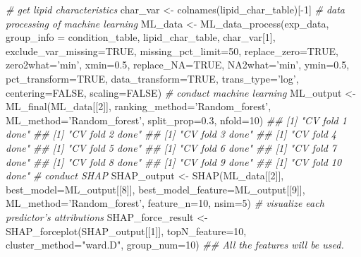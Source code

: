 \documentclass[]{article}
\newcommand{\hlnum}[1]{\textcolor[rgb]{0.816,0.125,0.439}{#1}}%
\newcommand{\hlstr}[1]{\textcolor[rgb]{0.251,0.627,0.251}{#1}}%
\newcommand{\hlcom}[1]{\textcolor[rgb]{0.502,0.502,0.502}{\textit{#1}}}%
\newcommand{\hlopt}[1]{\textcolor[rgb]{0,0,0}{#1}}%
\newcommand{\hlstd}[1]{\textcolor[rgb]{0.251,0.251,0.251}{#1}}%
\newcommand{\hlkwc}[1]{\textcolor[rgb]{0.251,0.251,0.251}{#1}}%
\newcommand{\hlkwd}[1]{\textcolor[rgb]{0.878,0.439,0.125}{#1}}%
\newenvironment{Shaded}{\begin{myshaded}}{\end{myshaded}}
\newcommand{\KeywordTok}[1]{\hlkwd{#1}}
\newcommand{\DataTypeTok}[1]{\hlkwc{#1}}
\newcommand{\DecValTok}[1]{\hlnum{#1}}
\newcommand{\FloatTok}[1]{\hlnum{#1}}
\newcommand{\StringTok}[1]{\hlstr{#1}}
\newcommand{\CommentTok}[1]{\hlcom{#1}}
\newcommand{\OtherTok}[1]{{#1}}
\newcommand{\OperatorTok}[1]{\hlopt{#1}}
\newcommand{\NormalTok}[1]{\hlstd{#1}}
\begin{document}
\begin{Shaded}
\begin{Highlighting}[]
\CommentTok{# get lipid characteristics}
\NormalTok{char_var <-}\StringTok{ }\KeywordTok{colnames}\NormalTok{(lipid_char_table)[}\OperatorTok{-}\DecValTok{1}\NormalTok{]}
\CommentTok{# data processing of machine learning}
\NormalTok{ML_data <-}\StringTok{ }\KeywordTok{ML_data_process}\NormalTok{(exp_data, }\DataTypeTok{group_info =}\NormalTok{ condition_table,}
\NormalTok{                           lipid_char_table, char_var[}\DecValTok{1}\NormalTok{],}
                           \DataTypeTok{exclude_var_missing=}\OtherTok{TRUE}\NormalTok{, }\DataTypeTok{missing_pct_limit=}\DecValTok{50}\NormalTok{,}
                           \DataTypeTok{replace_zero=}\OtherTok{TRUE}\NormalTok{, }\DataTypeTok{zero2what=}\StringTok{'min'}\NormalTok{, }\DataTypeTok{xmin=}\FloatTok{0.5}\NormalTok{,}
                           \DataTypeTok{replace_NA=}\OtherTok{TRUE}\NormalTok{, }\DataTypeTok{NA2what=}\StringTok{'min'}\NormalTok{, }\DataTypeTok{ymin=}\FloatTok{0.5}\NormalTok{,}
                           \DataTypeTok{pct_transform=}\OtherTok{TRUE}\NormalTok{, }\DataTypeTok{data_transform=}\OtherTok{TRUE}\NormalTok{,}
                           \DataTypeTok{trans_type=}\StringTok{'log'}\NormalTok{, }\DataTypeTok{centering=}\OtherTok{FALSE}\NormalTok{, }\DataTypeTok{scaling=}\OtherTok{FALSE}\NormalTok{)}
\CommentTok{# conduct machine learning}
\NormalTok{ML_output <-}\StringTok{ }\KeywordTok{ML_final}\NormalTok{(ML_data[[}\DecValTok{2}\NormalTok{]], }\DataTypeTok{ranking_method=}\StringTok{'Random_forest'}\NormalTok{,}
                      \DataTypeTok{ML_method=}\StringTok{'Random_forest'}\NormalTok{, }\DataTypeTok{split_prop=}\FloatTok{0.3}\NormalTok{, }\DataTypeTok{nfold=}\DecValTok{10}\NormalTok{)}
\CommentTok{## [1] "CV fold 1 done"}
\CommentTok{## [1] "CV fold 2 done"}
\CommentTok{## [1] "CV fold 3 done"}
\CommentTok{## [1] "CV fold 4 done"}
\CommentTok{## [1] "CV fold 5 done"}
\CommentTok{## [1] "CV fold 6 done"}
\CommentTok{## [1] "CV fold 7 done"}
\CommentTok{## [1] "CV fold 8 done"}
\CommentTok{## [1] "CV fold 9 done"}
\CommentTok{## [1] "CV fold 10 done"}
\CommentTok{# conduct SHAP}
\NormalTok{SHAP_output <-}\StringTok{ }\KeywordTok{SHAP}\NormalTok{(ML_data[[}\DecValTok{2}\NormalTok{]], }\DataTypeTok{best_model=}\NormalTok{ML_output[[}\DecValTok{8}\NormalTok{]],}
                    \DataTypeTok{best_model_feature=}\NormalTok{ML_output[[}\DecValTok{9}\NormalTok{]],}
                    \DataTypeTok{ML_method=}\StringTok{'Random_forest'}\NormalTok{, }\DataTypeTok{feature_n=}\DecValTok{10}\NormalTok{, }\DataTypeTok{nsim=}\DecValTok{5}\NormalTok{)}
\CommentTok{# visualize each predictor’s attributions}
\NormalTok{SHAP_force_result <-}\StringTok{ }\KeywordTok{SHAP_forceplot}\NormalTok{(SHAP_output[[}\DecValTok{1}\NormalTok{]], }\DataTypeTok{topN_feature=}\DecValTok{10}\NormalTok{,}
                                    \DataTypeTok{cluster_method=}\StringTok{"ward.D"}\NormalTok{, }\DataTypeTok{group_num=}\DecValTok{10}\NormalTok{)}
\CommentTok{## All the features will be used.}


\end{Highlighting}
\end{Shaded}
\end{document}
